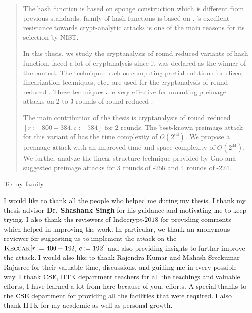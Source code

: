 \begin{abstract}
The \KECCAK{} hash function is based on sponge construction which is different from previous \SHA{} standards.  family of hash functions is based on \Keccak{}. \Keccak{}'s excellent resistance towards crypt-analytic attacks is one of the main reasons for its selection by NIST.
	
In this thesis, we study the cryptanalysis of round reduced variants of \KECCAK{} hash function. \KECCAK{} faced a lot of cryptanalysis since it was declared as the winner of the  contest. The techniques such as computing partial solutions for slices,  linearization techniques, etc.. are used for the cryptanalysis of round-reduced \KECCAK{}. These techniques are very effective for mounting preimage attacks on 2 to 3 rounds of round-reduced \KECCAK{}. 

The main contribution of the thesis is cryptanalysis of round reduced \KECCAK{}$[r:=800-384, c:=384]$ for $2$ rounds. The best-known preimage attack for this variant of \KECCAK{} has the time complexity of $O(2^{64})$. We propose a preimage attack with an improved time and space complexity of $O(2^{44})$. We further analyze the linear structure technique provided by Guo \etal and suggested preimage attacks for 3 rounds of \KECCAK-$256$ and 4 rounds of \KECCAK-$224$.
\end{abstract}

\begin{dedication}
To my family
\end{dedication}

\begin{acknowledgments}

I would like to thank all the people who helped me during my thesis. I thank my thesis advisor \textbf{Dr. Shashank Singh} for his guidance and motivating me to keep trying. I also thank the reviewers of Indocrypt-$2018$ for providing comments which helped in improving the work. In particular, we thank an anonymous reviewer for suggesting us to implement the attack on the $\mbox{\textsc{Keccak}}[r:=400-192,\, c:=192]$ and also providing insights to further improve the attack. I would also like to thank Rajendra Kumar and Mahesh Sreekumar Rajasree for their valuable time, discussions, and guiding me in every possible way. I thank CSE, IITK department teachers for all the teachings and valuable efforts, I have learned a lot from here because of your efforts. A special thanks to the CSE department for providing all the facilities that were required. I also thank IITK for my academic as well as personal growth.
\end{acknowledgments}

\tableofcontents
\listoftables

\cleardoublepage
{} \label{listoffig}
\listoffigures

\cleardoublepage{} %
